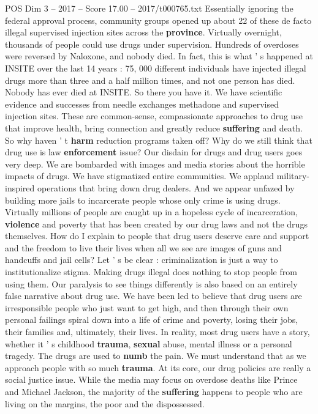\begin{textsample}{POS Dim 3 – 2017 – Score 17.00 – 2017/t000765.txt}
Essentially ignoring the federal approval process, community groups opened up about 22 of these de facto illegal supervised injection sites across the \textbf{province}.
Virtually overnight, thousands of people could use drugs under supervision.
Hundreds of overdoses were reversed by Naloxone, and nobody died.
In fact, this is what ' s happened at INSITE over the last 14 years : 75, 000 different individuals have injected illegal drugs more than three and a half million times, and not one person has died.
Nobody has ever died at INSITE.
So there you have it.
We have scientific evidence and successes from needle exchanges methadone and supervised injection sites.
These are common-sense, compassionate approaches to drug use that improve health, bring connection and greatly reduce \textbf{suffering} and death.
So why haven ' t \textbf{harm} reduction programs taken off?
Why do we still think that drug use is law \textbf{enforcement} issue?
Our disdain for drugs and drug users goes very deep.
We are bombarded with images and media stories about the horrible impacts of drugs.
We have stigmatized entire communities.
We applaud military-inspired operations that bring down drug dealers.
And we appear unfazed by building more jails to incarcerate people whose only crime is using drugs.
Virtually millions of people are caught up in a hopeless cycle of incarceration, \textbf{violence} and poverty that has been created by our drug laws and not the drugs themselves.
How do I explain to people that drug users deserve care and support and the freedom to live their lives when all we see are images of guns and handcuffs and jail cells?
Let ' s be clear : criminalization is just a way to institutionalize stigma.
Making drugs illegal does nothing to stop people from using them.
Our paralysis to see things differently is also based on an entirely false narrative about drug use.
We have been led to believe that drug users are irresponsible people who just want to get high, and then through their own personal failings spiral down into a life of crime and poverty, losing their jobs, their families and, ultimately, their lives.
In reality, most drug users have a story, whether it ' s childhood \textbf{trauma}, \textbf{sexual} abuse, mental illness or a personal tragedy.
The drugs are used to \textbf{numb} the pain.
We must understand that as we approach people with so much \textbf{trauma}.
At its core, our drug policies are really a social justice issue.
While the media may focus on overdose deaths like Prince and Michael Jackson, the majority of the \textbf{suffering} happens to people who are living on the margins, the poor and the dispossessed.

\end{textsample}
